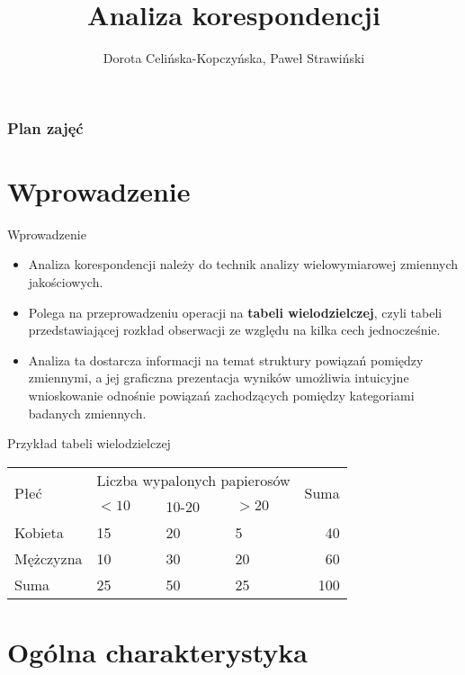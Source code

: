 \documentclass{beamer}
\begin{document}
\begin{frame}
\title[Tytuł]{Analiza korespondencji}

\author{Dorota Celińska-Kopczyńska, Paweł Strawiński}

\titlepage
\end{frame}
\begin{frame}[allowframebreaks]
\frametitle{Plan zajęć}
  \tableofcontents
\end{frame}

\section{Wprowadzenie}
\begin{frame}{Wprowadzenie}
  \begin{itemize}
  \item Analiza korespondencji należy do technik analizy wielowymiarowej zmiennych jakościowych.
  \item Polega na przeprowadzeniu operacji na \textbf{tabeli wielodzielczej}, czyli tabeli przedstawiającej rozkład obserwacji ze względu na kilka cech jednocześnie.
  \item Analiza ta dostarcza informacji na temat struktury powiązań pomiędzy zmiennymi, a jej graficzna prezentacja wyników umożliwia intuicyjne wnioskowanie odnośnie powiązań zachodzących pomiędzy kategoriami badanych zmiennych. 
  \end{itemize}
\end{frame}

\begin{frame}{Przykład tabeli wielodzielczej}
\begin{tabular}{|l|p{2cm}|p{2cm}|p{2cm}|r|}\hline
\multirow{2}{*}{Płeć} & \multicolumn{3}{|c|}{Liczba wypalonych papierosów}& \multirow{2}{*}{Suma}\\ \cline{2-4}
& $<10$ & 10-20 & $>20$ & \\ \hline
Kobieta & 15 & 20 & 5 & 40\\\hline
Mężczyzna & 10 & 30 & 20 & 60\\\hline
Suma & 25 & 50 & 25 & 100\\\hline
\end{tabular}
\end{frame}

\section{Ogólna charakterystyka}
\end{document}
